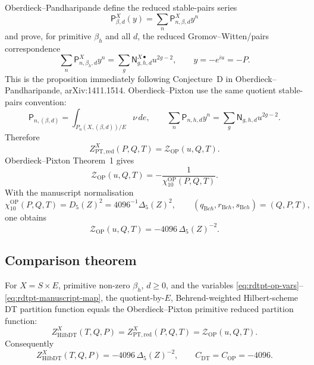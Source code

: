 Oberdieck--Pandharipande define the reduced stable-pairs series
\[
\mathsf P^X_{\beta,d}(y)=\sum_n\mathsf P^X_{n,\beta,d}y^n
\]
and prove, for primitive \(\beta_h\) and all \(d\), the reduced
Gromov--Witten/pairs correspondence
\begin{equation}
\label{eq:rdtpt-gw-pt}
\sum_n\mathsf P^X_{n,\beta_h,d}y^n
=
\sum_g\mathsf N^{X\bullet}_{g,h,d}u^{2g-2},
\qquad
y=-e^{iu}=-P.
\end{equation}
This is the proposition immediately following Conjecture~D in
Oberdieck--Pandharipande, arXiv:1411.1514.  Oberdieck--Pixton use the
same quotient stable-pairs convention:
\begin{equation}
\label{eq:rdtpt-op-pt}
\mathsf P_{n,(\beta,d)}
=
\int_{P_n(X,(\beta,d))/E}\nu\,de,
\qquad
\sum_n\mathsf P_{n,h,d}y^n
=
\sum_g\mathsf N_{g,h,d}u^{2g-2}.
\end{equation}
Therefore
\begin{equation}
\label{eq:rdtpt-pt-op}
Z^X_{\mathrm{PT,red}}(P,Q,T)
=
\mathcal Z_{\mathrm{OP}}(u,Q,T).
\end{equation}
Oberdieck--Pixton Theorem~1 gives
\begin{equation}
\label{eq:rdtpt-op-theorem}
\mathcal Z_{\mathrm{OP}}(u,Q,T)
=
-\frac{1}{\chi_{10}^{\mathrm{OP}}(P,Q,T)}.
\end{equation}
With the manuscript normalisation
\begin{equation}
\label{eq:rdtpt-chi-normalisation}
\chi_{10}^{\mathrm{OP}}(P,Q,T)
=D_5(Z)^2
=4096^{-1}\Delta_5(Z)^2,
\qquad
(q_{\mathrm Bch},r_{\mathrm Bch},s_{\mathrm Bch})=(Q,P,T),
\end{equation}
one obtains
\begin{equation}
\label{eq:rdtpt-op-constant}
\mathcal Z_{\mathrm{OP}}(u,Q,T)
=-4096\,\Delta_5(Z)^{-2}.
\end{equation}

\subsection{Comparison theorem}

\begin{theorem}
\label{thm:rdtpt-comparison}
For \(X=S\times E\), primitive non-zero \(\beta_h\), \(d\geq0\), and
the variables \eqref{eq:rdtpt-op-vars}--\eqref{eq:rdtpt-manuscript-map},
the quotient-by-\(E\), Behrend-weighted Hilbert-scheme DT partition
function equals the Oberdieck--Pixton primitive reduced partition
function:
\begin{equation}
\label{eq:rdtpt-main}
Z^X_{\mathrm{HilbDT}}(T,Q,P)
=
Z^X_{\mathrm{PT,red}}(P,Q,T)
=
\mathcal Z_{\mathrm{OP}}(u,Q,T).
\end{equation}
Consequently
\begin{equation}
\label{eq:rdtpt-main-constant}
Z^X_{\mathrm{HilbDT}}(T,Q,P)
=
-4096\,\Delta_5(Z)^{-2},
\qquad
C_{\mathrm{DT}}=C_{\mathrm{OP}}=-4096.
\end{equation}
\end{theorem}

